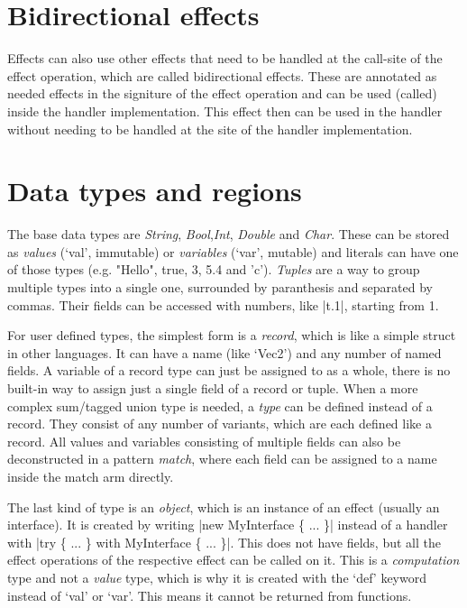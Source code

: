 \section{Bidirectional effects}

Effects can also use other effects that need to be handled at the call-site of the effect operation, which are called bidirectional effects. These are annotated as needed effects in the signiture of the effect operation and can be used (called) inside the handler implementation. This effect then can be used in the handler without needing to be handled at the site of the handler implementation.

\section{Data types and regions}

The base data types are \textit{String}, \textit{Bool},\textit{Int}, \textit{Double} and \textit{Char}. These can be stored as \textit{values} (`val', immutable) or \textit{variables} (`var', mutable) and literals can have one of those types (e.g. "Hello", true, 3, 5.4 and 'c'). \textit{Tuples} are a way to group multiple types into a single one, surrounded by paranthesis and separated by commas. Their fields can be accessed with numbers, like |t.1|, starting from 1.

For user defined types, the simplest form is a \textit{record}, which is like a simple struct in other languages. It can have a name (like `Vec2') and any number of named fields. A variable of a record type can just be assigned to as a whole, there is no built-in way to assign just a single field of a record or tuple. When a more complex sum/tagged union type is needed, a \textit{type} can be defined instead of a record. They consist of any number of variants, which are each defined like a record. All values and variables consisting of multiple fields can also be deconstructed in a pattern \textit{match}, where each field can be assigned to a name inside the match arm directly.

The last kind of type is an \textit{object}, which is an instance of an effect (usually an interface). It is created by writing |new MyInterface \{ ... \}| instead of a handler with |try \{ ... \} with MyInterface \{ ... \}|. This does not have fields, but all the effect operations of the respective effect can be called on it. This is a \textit{computation} type and not a \textit{value} type, which is why it is created with the `def' keyword instead of `val' or `var'. This means it cannot be returned from functions.

